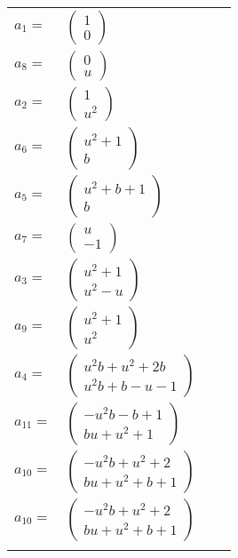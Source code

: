 \documentclass[1p]{elsarticle_modified}
\theoremstyle{definition}
\begin{document}
\begin{tabular}{m{7pt} m{180pt} m{7pt} m{180pt} }
\flushright $a_{1}=$&$\begin{pmatrix}1\\0\end{pmatrix}$ \\
\flushright $a_{8}=$&$\begin{pmatrix}0\\u\end{pmatrix}$ \\
\flushright $a_{2}=$&$\begin{pmatrix}1\\u^2\end{pmatrix}$ \\
\flushright $a_{6}=$&$\begin{pmatrix}u^2+1\\b\end{pmatrix}$ \\
\flushright $a_{5}=$&$\begin{pmatrix}u^2+b+1\\b\end{pmatrix}$ \\
\flushright $a_{7}=$&$\begin{pmatrix}u\\-1\end{pmatrix}$ \\
\flushright $a_{3}=$&$\begin{pmatrix}u^2+1\\u^2- u\end{pmatrix}$ \\
\flushright $a_{9}=$&$\begin{pmatrix}u^2+1\\u^2\end{pmatrix}$ \\
\flushright $a_{4}=$&$\begin{pmatrix}u^2 b+u^2+2 b\\u^2 b+b- u-1\end{pmatrix}$ \\
\flushright $a_{11}=$&$\begin{pmatrix}- u^2 b- b+1\\b u+u^2+1\end{pmatrix}$ \\
\flushright $a_{10}=$&$\begin{pmatrix}- u^2 b+u^2+2\\b u+u^2+b+1\end{pmatrix}$\\ \flushright $a_{10}=$&$\begin{pmatrix}- u^2 b+u^2+2\\b u+u^2+b+1\end{pmatrix}$\\&\end{tabular}
\end{document}
